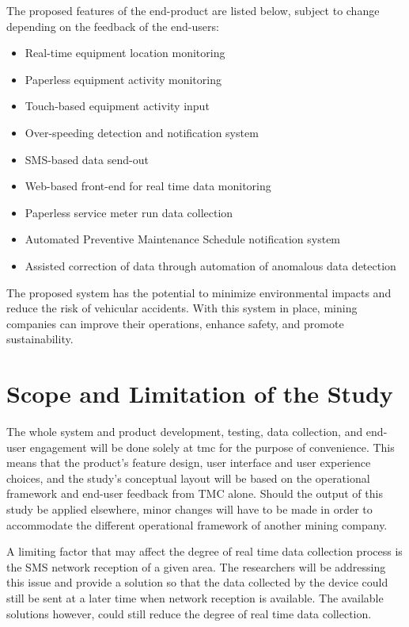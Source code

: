 \documentclass[12pt]{report}
\begin{document}
The proposed features of the end-product are listed below, subject to change depending on the feedback of the end-users:
\begin{itemize}
\setlength\itemsep{-0.5em}
    \item Real-time equipment location monitoring
    \item Paperless equipment activity monitoring
    \item Touch-based equipment activity input
    \item Over-speeding detection and notification system
    \item SMS-based data send-out
    \item Web-based front-end for real time data monitoring
    \item Paperless service meter run data collection
    \item Automated Preventive Maintenance Schedule notification system
    \item Assisted correction of data through automation of anomalous data detection
\end{itemize}

The proposed system has the potential to minimize environmental impacts and reduce the risk of vehicular accidents.
With this system in place, mining companies can improve their operations, enhance safety, and promote sustainability.

\section{Scope and Limitation of the Study}

The whole system and product development, testing, data collection, and end-user engagement will be done solely at \Gls{tmc} for the purpose of convenience.
This means that the product's feature design, user interface and user experience choices, and the study's conceptual layout will be based on the operational framework and end-user feedback from TMC alone.
Should the output of this study be applied elsewhere, minor changes will have to be made in order to accommodate the different operational framework of another mining company.

A limiting factor that may affect the degree of real time data collection process is the SMS network reception of a given area.
The researchers will be addressing this issue and provide a solution so that the data collected by the device could still be sent at a later time when network reception is available.
The available solutions however, could still reduce the degree of real time data collection.
\end{document}
